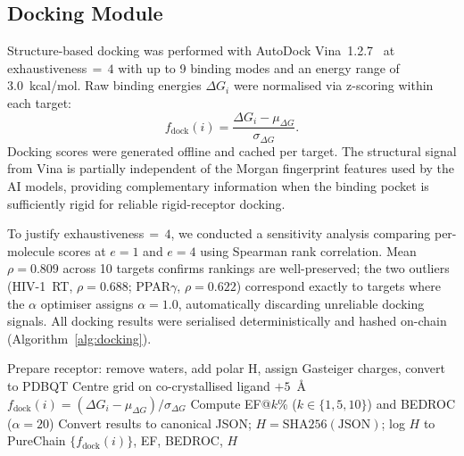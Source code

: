 \documentclass[conference]{IEEEtran}
\begin{document}
\subsection{\textbf{Docking Module}}
\label{sec:docking}

Structure-based docking was performed with AutoDock
Vina~1.2.7~\cite{eberhardt2021autodock} at
exhaustiveness$\,{=}\,4$ with up to 9 binding modes and
an energy range of 3.0~kcal/mol.
Raw binding energies $\Delta G_i$ were normalised via
z-scoring within each target:
\begin{equation}
\label{eq:fdock}
f_{\mathrm{dock}}(i)
  = \frac{\Delta G_i - \mu_{\Delta G}}{\sigma_{\Delta G}}.
\end{equation}
Docking scores were generated offline and cached per target.
The structural signal from Vina is partially independent
of the Morgan fingerprint features used by the AI models,
providing complementary information when the binding pocket
is sufficiently rigid for reliable rigid-receptor docking.

To justify exhaustiveness$\,{=}\,4$, we conducted a
sensitivity analysis comparing per-molecule scores at
$e{=}1$ and $e{=}4$ using Spearman rank correlation.
Mean $\rho = 0.809$ across 10 targets confirms rankings
are well-preserved; the two outliers (HIV-1~RT,
$\rho=0.688$; PPAR$\gamma$, $\rho=0.622$) correspond
exactly to targets where the $\alpha$ optimiser assigns
$\alpha=1.0$, automatically discarding unreliable
docking signals.
All docking results were serialised deterministically
and hashed on-chain (Algorithm~\ref{alg:docking}).

\begin{algorithm}[!htbp]
\scriptsize
\caption{Structure-Based Docking and Enrichment Evaluation}
\label{alg:docking}
Prepare receptor: remove waters, add polar H,
  assign Gasteiger charges, convert to PDBQT\;
Centre grid on co-crystallised ligand $+ 5$~\AA\;
$f_{\mathrm{dock}}(i) = (\Delta G_i - \mu_{\Delta G})
  / \sigma_{\Delta G}$\;
Compute EF@$k$\% ($k \in \{1,5,10\}$) and BEDROC
  ($\alpha = 20$)\;
Convert results to canonical JSON;
  $H = \mathrm{SHA256}(\mathrm{JSON})$;
  log $H$ to PureChain\;
\Return $\{f_{\mathrm{dock}}(i)\}$, EF, BEDROC, $H$\;
\end{algorithm}
\end{document}

